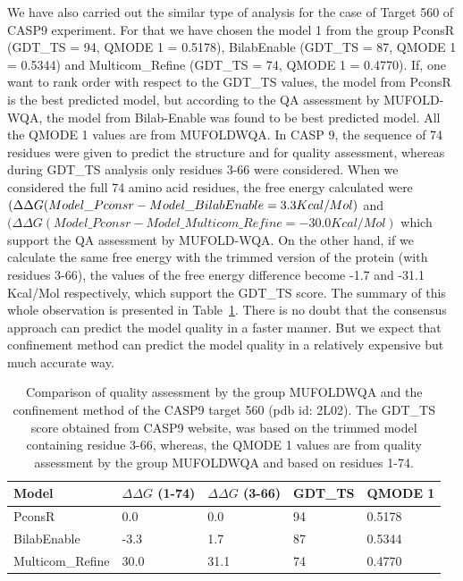\documentclass[12pt]{article}
\begin{document}
We have also carried out the similar type of analysis for the case of Target 560 of CASP9 experiment. For that 
we have chosen the model 1 from the group PconsR (GDT\_TS = 94, QMODE 1 = 0.5178), Bilab\-Enable (GDT\_TS = 87, QMODE 1 = 0.5344) 
and Multicom\_Refine (GDT\_TS = 74, QMODE 1 = 0.4770). If, one want to rank order with respect to the GDT\_TS values, the model from 
PconsR is the best predicted model, but according to the QA assessment by MUFOLD-WQA, the model from Bilab-Enable was found to be best predicted model. 
All the QMODE 1 values are from MUFOLD\-WQA. In CASP 9, the sequence of 74 residues were given to predict the structure and for 
quality assessment, whereas during GDT\_TS analysis only residues 3-66 were considered. When we considered the full 74 amino acid 
residues, the free energy calculated were $(\Delta \Delta G (Model\_Pconsr - Model\_Bilab\-Enable = 3.3 Kcal/Mol)$ and 
$(\Delta \Delta G (Model\_Pconsr - Model\_Multicom\_Refine = -30.0 Kcal/Mol)$ which 
support the QA assessment by MUFOLD-WQA. On the other hand, if we calculate the same free energy with the trimmed version of the protein 
(with residues 3-66), the values of the free energy difference become -1.7 and -31.1 Kcal/Mol respectively, which support the GDT\_TS score. 
The summary of this whole observation is presented in Table~\ref{table:560QA}.
There is no doubt that the consensus approach can predict the model quality in a faster manner. But we expect that confinement
method can predict the model quality in a relatively expensive but much accurate way.

\begin{table}
\label{table:560QA}
\begin{center}
\begin{tabular}{| l | l | l | l | l |}
\hline
Model            &  $\Delta \Delta G$ (1-74)  & $\Delta \Delta G$ (3-66) &    GDT\_TS    & QMODE 1  \\ \hline
PconsR           &         0.0                &      0.0                 &    94         &  0.5178   \\ \hline
Bilab\-Enable     &        -3.3                &      1.7                 &    87         &  0.5344   \\ \hline
Multicom\_Refine &        30.0                &     31.1                 &    74         &  0.4770   \\ \hline
\end{tabular}
\end{center}
\caption{Comparison of quality assessment by the group MUFOLD\-WQA and the confinement method of the CASP9 target 560 (pdb id: 2L02). 
The GDT\_TS score obtained from CASP9 website, was based on the trimmed model containing residue 3-66, whereas, the QMODE 1 values are from
quality assessment by the group MUFOLD\-WQA and based on residues 1-74.}
\end{table}  
\end{document}
